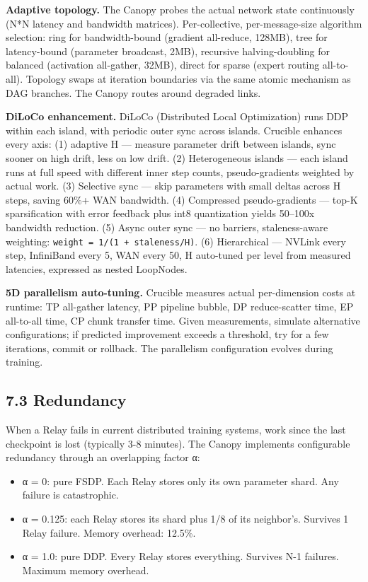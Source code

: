 \textbf{Adaptive topology.} The Canopy probes the actual network state continuously (N*N latency and bandwidth matrices). Per-collective, per-message-size algorithm selection: ring for bandwidth-bound (gradient all-reduce, 128MB), tree for latency-bound (parameter broadcast, 2MB), recursive halving-doubling for balanced (activation all-gather, 32MB), direct for sparse (expert routing all-to-all). Topology swaps at iteration boundaries via the same atomic mechanism as DAG branches. The Canopy routes around degraded links.

\textbf{DiLoCo enhancement.} DiLoCo (Distributed Local Optimization) runs DDP within each island, with periodic outer sync across islands. Crucible enhances every axis: (1) adaptive H --- measure parameter drift between islands, sync sooner on high drift, less on low drift. (2) Heterogeneous islands --- each island runs at full speed with different inner step counts, pseudo-gradients weighted by actual work. (3) Selective sync --- skip parameters with small deltas across H steps, saving 60\%+ WAN bandwidth. (4) Compressed pseudo-gradients --- top-K sparsification with error feedback plus int8 quantization yields 50--100x bandwidth reduction. (5) Async outer sync --- no barriers, staleness-aware weighting: \texttt{weight\ =\ 1/(1\ +\ staleness/H)}. (6) Hierarchical --- NVLink every step, InfiniBand every 5, WAN every 50, H auto-tuned per level from measured latencies, expressed as nested LoopNodes.

\textbf{5D parallelism auto-tuning.} Crucible measures actual per-dimension costs at runtime: TP all-gather latency, PP pipeline bubble, DP reduce-scatter time, EP all-to-all time, CP chunk transfer time. Given measurements, simulate alternative configurations; if predicted improvement exceeds a threshold, try for a few iterations, commit or rollback. The parallelism configuration evolves during training.

\subsection{7.3 Redundancy}\label{redundancy}

When a Relay fails in current distributed training systems, work since the last checkpoint is lost (typically 3-8 minutes). The Canopy implements configurable redundancy through an overlapping factor α:

\begin{itemize}
\tightlist
\item
  α = 0: pure FSDP. Each Relay stores only its own parameter shard. Any failure is catastrophic.
\item
  α = 0.125: each Relay stores its shard plus 1/8 of its neighbor's. Survives 1 Relay failure. Memory overhead: 12.5\%.
\item
  α = 1.0: pure DDP. Every Relay stores everything. Survives N-1 failures. Maximum memory overhead.
\end{itemize}


